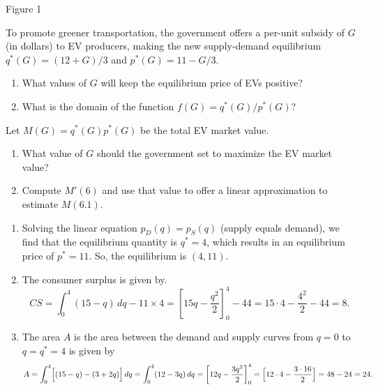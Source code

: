 \documentclass[11pt]{exam}
\begin{document}
\begin{questions}
\begin{minipage}{0.35\textwidth}
\begin{center}
{\small Figure 1}
\end{center}
\end{minipage}

\vspace{0.2cm}
To promote greener transportation, the government offers a per-unit subsidy of \(G\) (in dollars) to EV producers, making the new supply-demand equilibrium $q^*(G) = (12 + G)/3$ and $p^*(G) = 11 - G/3$.
\begin{enumerate}[label=(\alph*), leftmargin=0.7cm, start=4]
    \item What values of $G$ will keep the equilibrium price of EVs positive? 
    \item What is the domain of the function $f(G) = q^*(G)/p^*(G)$?
\end{enumerate}

Let $M(G) = q^*(G)p^*(G)$ be the total EV market value.
\begin{enumerate}[label=(\alph*), leftmargin=0.7cm, start=6]
    \item What value of $G$ should the government set to maximize the EV market value?
    \item Compute $M'(6)$ and use that value to offer a linear approximation to estimate $M(6.1)$.
\end{enumerate}

\begin{solution}
\begin{enumerate}[label=(\alph*)]
    \item Solving the linear equation $p_D(q)=p_S(q)$ (supply equals demand), we find that the equilibrium quantity is $q^* = 4$, which results in an equilibrium price of $p^* = 11$.
    So, the equilibrium is \((4,11)\).
    
    \item The consumer surplus is given by.
    $$
    CS = \int_{0}^{4} (15 - q)\,dq - 11\times 4 = \left[15q - \frac{q^2}{2}\right]_0^4 - 44= 15\cdot 4 - \frac{4^2}{2} - 44 = 8.
    $$
    
    \item The area \(A\) is the area between the demand and supply curves from $q = 0$ to $q = q^*=4$ is given by
    $$
    A = \int_{0}^{4} \Bigl[(15 - q) - (3 + 2q)\Bigr] \, dq = \int_{0}^{4} (12 - 3q)\,dq = \left[12q - \frac{3q^2}{2}\right]_0^4 = \Bigl[12\cdot 4 - \frac{3\cdot 16}{2}\Bigr] = 48 - 24 = 24.
    $$
    

\end{enumerate}
\end{solution}
\end{questions}
\end{document}
